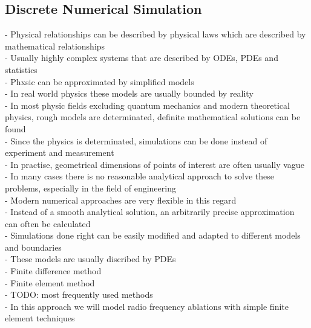 \documentclass[parskip=half, titlepage=yes, 12pt, BCOR=12mm, DIV=calc]{scrartcl}
\begin{document}
\subsection{Discrete Numerical Simulation}
- Physical relationships can be described by physical laws which are described by mathematical relationships \\
- Usually highly complex systems that are described by ODEs, PDEs and statistics \\
- Phxsic can be approximated by simplified models \\
- In real world physics these models are usually bounded by reality \\
- In most physic fields excluding quantum mechanics and modern theoretical physics, rough models are determinated, definite mathematical solutions can be found \\ 
- Since the physics is determinated, simulations can be done instead of experiment and measurement  \\
- In practise, geometrical dimensions of points of interest are often usually vague \\
- In many cases there is no reasonable analytical approach to solve these problems, especially in the field of engineering  \\
- Modern numerical approaches are very flexible in this regard \\
- Instead of a smooth analytical solution, an arbitrarily precise approximation can often be calculated \\
- Simulations done right can be easily modified and adapted to different models and boundaries \\
- These models are usually discribed by PDEs \\ 


- Finite difference method \\
- Finite element method \\
- TODO: most frequently used methods \\
- In this approach we will model radio frequency ablations with simple finite element techniques \\
\end{document}
